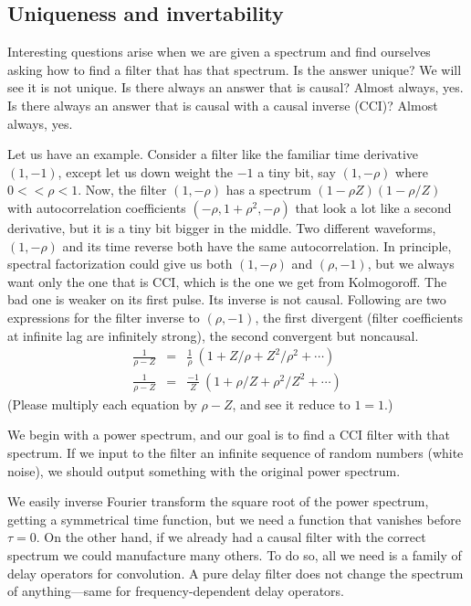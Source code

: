 \subsection{Uniqueness and invertability}
Interesting questions arise when we are given a spectrum
and find ourselves asking how to find a filter that has that spectrum.
Is the answer unique?  We will see it is not unique.
Is there always an answer that is causal?
Almost always, yes.
Is there always an answer that is causal with a causal inverse (CCI)?
Almost always, yes.
\par
Let us have an example.
Consider a filter like the familiar time derivative $(1,-1)$, except
let us down weight the $-1$ a tiny bit, say $(1,-\rho)$ where $0<<\rho<1$.
Now,
the filter $(1,-\rho)$
has a spectrum $(1-\rho Z)(1-\rho/Z)$ with autocorrelation
coefficients $(-\rho, 1+\rho^2,-\rho)$ that look a lot like a second derivative,
but it is a tiny bit bigger in the middle.
Two different waveforms, $(1,-\rho)$ and its time reverse
both have the same autocorrelation.
In principle,
spectral factorization could give us both $(1,-\rho)$ and $(\rho,-1)$,
but we always want only the one that is CCI,
which is the one we get from Kolmogoroff.
The bad one is weaker on its first pulse.
Its inverse is not causal.
Following are two expressions for the filter inverse to $(\rho,-1)$,
the first divergent
(filter coefficients at infinite lag are infinitely strong),
the second convergent but noncausal.
\begin{eqnarray}
\frac{1}{ \rho -Z} &=& \frac{ 1}{\rho}\ ( 1 +Z/\rho +Z^2/\rho^2+ \cdots)
\\
\frac{1}{ \rho -Z} &=& \frac{-1}{ Z}\ ( 1 + \rho/Z + \rho^2/Z^2 + \cdots)
\end{eqnarray}
(Please multiply each equation by $\rho -Z$, and see it reduce to $1=1$.)
\par
We begin with a power spectrum,
and our goal is to find a CCI filter with that spectrum.
If we input to the filter an infinite sequence of random numbers
(white noise),
we should output something with the original power spectrum.
\par
We easily inverse Fourier transform the square root of the power spectrum,
getting a symmetrical time function, but
we need a function that vanishes before $\tau=0$.
On the other hand,
if we already had a causal filter with the correct spectrum
we could manufacture many others.
To do so,
all we need is a family of delay operators for convolution.
A pure delay filter does not change the spectrum of anything---same for frequency-dependent delay operators.
